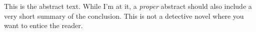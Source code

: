 This is the abstract text. While I'm at it, a \textit{proper} abstract should also
include a very short summary of the conclusion. This is not a detective novel
where you want to entice the reader.
